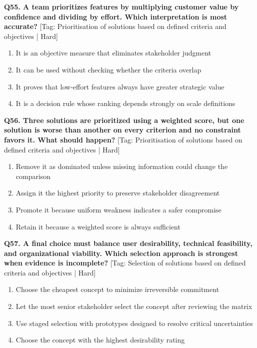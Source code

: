 \noindent\textbf{Q55. A team prioritizes features by multiplying customer value by confidence and dividing by effort. Which interpretation is most accurate?} \hfill [Tag: Prioritisation of solutions based on defined criteria and objectives | Hard]
\begin{enumerate}[label=(\alph*),topsep=2pt,itemsep=1pt,partopsep=0pt,parsep=0pt]
    \item {It is an objective measure that eliminates stakeholder judgment}
    \item {It can be used without checking whether the criteria overlap}
    \item {It proves that low-effort features always have greater strategic value}
    \item {It is a decision rule whose ranking depends strongly on scale definitions}
\end{enumerate}
\vspace{2mm}

\noindent\textbf{Q56. Three solutions are prioritized using a weighted score, but one solution is worse than another on every criterion and no constraint favors it. What should happen?} \hfill [Tag: Prioritisation of solutions based on defined criteria and objectives | Hard]
\begin{enumerate}[label=(\alph*),topsep=2pt,itemsep=1pt,partopsep=0pt,parsep=0pt]
    \item {Remove it as dominated unless missing information could change the comparison}
    \item {Assign it the highest priority to preserve stakeholder disagreement}
    \item {Promote it because uniform weakness indicates a safer compromise}
    \item {Retain it because a weighted score is always sufficient}
\end{enumerate}
\vspace{2mm}

\noindent\textbf{Q57. A final choice must balance user desirability, technical feasibility, and organizational viability. Which selection approach is strongest when evidence is incomplete?} \hfill [Tag: Selection of solutions based on defined criteria and objectives | Hard]
\begin{enumerate}[label=(\alph*),topsep=2pt,itemsep=1pt,partopsep=0pt,parsep=0pt]
    \item {Choose the cheapest concept to minimize irreversible commitment}
    \item {Let the most senior stakeholder select the concept after reviewing the matrix}
    \item {Use staged selection with prototypes designed to resolve critical uncertainties}
    \item {Choose the concept with the highest desirability rating}
\end{enumerate}
\vspace{2mm}

